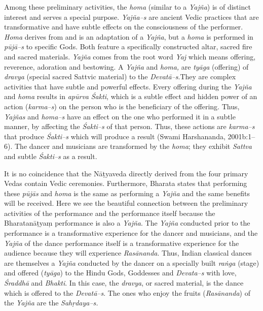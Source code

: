  Among these preliminary activities, the \textit{homa} (similar to a \textit{Yajña}) is of distinct interest and serves a special purpose. \textit{Yajña–s} are ancient Vedic practices that are transformative and have subtle effects on the consciousness of the performer. \textit{Homa} derives from and is an adaptation of a \textit{Yajña}, but a \textit{homa} is performed in \textit{pūjā–s }to specific Gods. Both feature a specifically constructed altar, sacred fire and sacred materials. \textit{Yajña} comes from the root word \textit{Yaj} which means offering, reverence, adoration and bestowing. A \textit{Yajña} and \textit{homa,} are \textit{tyāga }(offering) of \textit{dravya} (special sacred Sattvic material) to the \textit{Devatā–s}.\break They are complex activities that have subtle and powerful effects. Every offering during the \textit{Yajña} and \textit{homa} results in \textit{apūrva} \textit{Śakti}, which is a subtle effect and hidden power of an action (\textit{karma–s}) on the person who is the beneficiary of the offering. Thus, \textit{Yajñas} and \textit{homa–s} have an effect on the one who performed it in a subtle manner, by affecting the \textit{Śakti–s }of that person. Thus, these actions are \textit{karma–s} that produce \textit{Śakti–s} which will produce a result (Swami Harshananda, 2001b:1–6). The dancer and musicians are transformed by the \textit{homa}; they exhibit \textit{Sattva} and subtle \textit{Śakti–s} as a result.

It is no coincidence that the Nāṭyaveda directly derived from the four primary Vedas contain Vedic ceremonies. Furthermore, Bharata states that performing these \textit{pūjās} and \textit{homa} is the same as performing a \textit{Yajña} and the same benefits will be received. Here we see the beautiful connection between the preliminary activities of the performance and the performance itself because the Bharatanāṭyaṃ performance is also a \textit{Yajña}. The \textit{Yajña} conducted prior to the performance is a transformative experience for the dancer and musicians, and the \textit{Yajña} of the dance performance itself is a transformative experience for the audience because they will experience \textit{Rasānanda}. Thus, Indian classical dances are themselves a \textit{Yajña} conducted by the dancer on a specially built \textit{raṅga} (stage) and offered (\textit{tyāga}) to the Hindu Gods, Goddesses and \textit{Devata–s} with love, \textit{Śraddhā }and \textit{Bhakti}. In this case, the \textit{dravya}, or sacred material, is the dance which is offered to the \textit{Devatā–s}. The ones who enjoy the fruits (\textit{Rasānanda}) of the \textit{Yajña} are the \textit{Sahṛdaya–s.}


